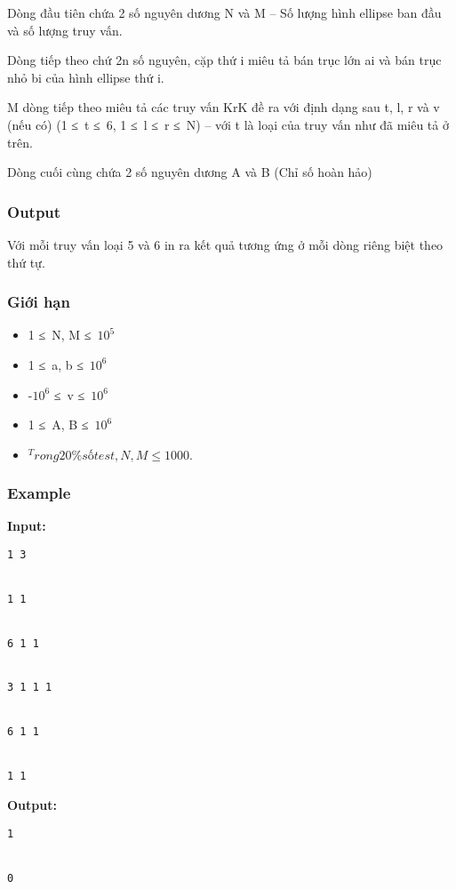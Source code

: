    Dòng đầu tiên chứa 2 số nguyên dương N và M – Số lượng hình ellipse ban đầu và số lượng truy vấn.  

   Dòng tiếp theo chứ 2n số nguyên, cặp thứ i miêu tả bán trục lớn ai và bán trục nhỏ bi của hình ellipse thứ i.  

   M dòng tiếp theo miêu tả các truy vấn KrK đề ra với định dạng sau t, l, r và v (nếu có) (1 ≤ t ≤ 6, 1 ≤ l ≤ r ≤ N) – với t là loại của truy vấn như đã miêu tả ở trên.  

   Dòng cuối cùng chứa 2 số nguyên dương A và B (Chỉ số hoàn hảo)  

\subsubsection{   Output  }

   Với mỗi truy vấn loại 5 và 6 in ra kết quả tương ứng ở mỗi dòng riêng biệt theo thứ tự.  

\subsubsection{   Giới hạn  }


\begin{itemize}
	\item     1 ≤ N, M ≤ $10^{5}$
	\item     1 ≤ a, b ≤ $10^{6}$
	\item     -$10^{6}$    ≤ v ≤ $10^{6}$
	\item     1 ≤ A, B ≤ $10^{6}$
	\item $^     Trong 20\% số test, N, M ≤ 1000.    $
\end{itemize}



\subsubsection{   Example  }

\textbf{    Input:   }
\begin{verbatim}
1 3


1 1


6 1 1 


3 1 1 1 


6 1 1


1 1\end{verbatim}

\textbf{    Output:   }
\begin{verbatim}
1


0\end{verbatim}
